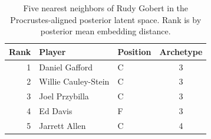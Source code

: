 \begin{table}[htbp]
  \centering\small
  \begin{tabular}{rllc}
    \toprule
    Rank & Player & Position & Archetype \\
    \midrule
    1 & Daniel Gafford & C & 3 \\
    2 & Willie Cauley-Stein & C & 3 \\
    3 & Joel Przybilla & C & 3 \\
    4 & Ed Davis & F & 3 \\
    5 & Jarrett Allen & C & 4 \\
    \bottomrule
  \end{tabular}
  \caption{Five nearest neighbors of Rudy Gobert in the Procrustes-aligned posterior latent space. Rank is by posterior mean embedding distance.}
  \label{tab:Rudy_Gobert_neighbors}
\end{table}

